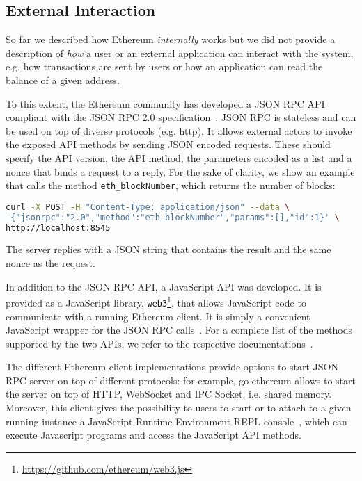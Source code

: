 \subsection{External Interaction}

So far we described how Ethereum \emph{internally} works but we did not provide
a description of \emph{how} a user or an external application can interact with
the system, e.g. how transactions are sent by users or how an application can
read the balance of a given address.

To this extent, the Ethereum community has developed a JSON RPC
API~\cite{bib:json-rpc} compliant with the JSON RPC 2.0
specification~\cite{bib:json2012json}. JSON RPC is stateless and can be used on
top of diverse protocols (e.g. http). It allows external actors to invoke the
exposed API methods by sending JSON encoded requests. These should specify the
API version, the API method, the parameters encoded as a list and a nonce that
binds a request to a reply. For the sake of clarity, we show an example that
calls the method \verb|eth_blockNumber|, which returns the number of blocks:

\begin{lstlisting}[language=bash]
curl -X POST -H "Content-Type: application/json" --data \
'{"jsonrpc":"2.0","method":"eth_blockNumber","params":[],"id":1}' \
http://localhost:8545
\end{lstlisting}

The server replies with a JSON string that contains the result and the same
nonce as the request.

In addition to the JSON RPC API, a JavaScript API was developed. It is provided
as a JavaScript library,
\texttt{web3}\footnote{\url{https://github.com/ethereum/web3.js}}, that allows
JavaScript code to communicate with a running Ethereum client. It is simply a
convenient JavaScript wrapper for the JSON RPC calls~\cite{bib:javascript-api}.
For a complete list of the methods supported by the two APIs, we refer to the
respective documentations~\cite{bib:json-rpc, bib:javascript-api}.

The different Ethereum client implementations provide options to start JSON RPC
server on top of different protocols: for example, go ethereum allows to start
the server on top of HTTP, WebSocket and IPC Socket, i.e. shared memory.
Moreover, this client gives the possibility to users to start or to attach to a
given running instance a JavaScript Runtime Environment REPL
console~\cite{bib:js-console}, which can execute Javascript programs and access
the JavaScript API methods.
